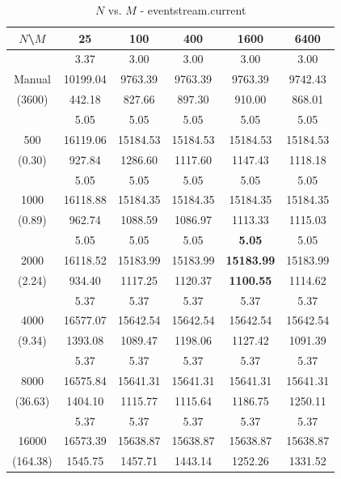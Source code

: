 \begin{table}[th]\small
\label{tab:eventstream.current}
\centering
\begin{tabular}{|c||c|c|c|c|c|}
\hline
$N$\textbackslash $M$& 25 & 100 & 400 & 1600 & 6400 \\ \hline \hline
       & 3.37     & 3.00    & 3.00    & 3.00    & 3.00 \\ 
Manual & 10199.04 & 9763.39 & 9763.39 & 9763.39 & 9742.43 \\
(3600) & 442.18  & 827.66  & 897.30 & 910.00 & 868.01 \\ \hline
     & 5.05 & 5.05 & 5.05 & 5.05 & 5.05\\
500  & 16119.06 & 15184.53 & 15184.53 & 15184.53 & 15184.53\\ 
(0.30)  & 927.84 & 1286.60 & 1117.60 & 1147.43 & 1118.18\\ \hline 
  & 5.05 & 5.05 & 5.05 & 5.05 & 5.05\\ 
1000  & 16118.88 & 15184.35 & 15184.35 & 15184.35 & 15184.35\\ 
(0.89)  & 962.74 & 1088.59 & 1086.97 & 1113.33 & 1115.03\\ \hline 
  & 5.05 & 5.05 & 5.05 & {\bf 5.05} & 5.05\\ 
2000  & 16118.52 & 15183.99 & 15183.99 & {\bf 15183.99} & 15183.99\\ 
(2.24)  & 934.40 & 1117.25 & 1120.37 & {\bf 1100.55} & 1114.62\\ \hline 
  & 5.37 & 5.37 & 5.37 & 5.37 & 5.37\\ 
4000  & 16577.07 & 15642.54 & 15642.54 & 15642.54 & 15642.54\\ 
(9.34)  & 1393.08 & 1089.47 & 1198.06 & 1127.42 & 1091.39\\ \hline 
  & 5.37 & 5.37 & 5.37 & 5.37 & 5.37\\ 
8000  & 16575.84 & 15641.31 & 15641.31 & 15641.31 & 15641.31\\ 
(36.63)  & 1404.10 & 1115.77 & 1115.64 & 1186.75 & 1250.11\\ \hline 
  & 5.37 & 5.37 & 5.37 & 5.37 & 5.37\\ 
16000  & 16573.39 & 15638.87 & 15638.87 & 15638.87 & 15638.87\\ 
(164.38)  & 1545.75 & 1457.71 & 1443.14 & 1252.26 & 1331.52\\ \hline 
\end{tabular}
\caption{$N$ vs. $M$ - eventstream.current}
\end{table}

